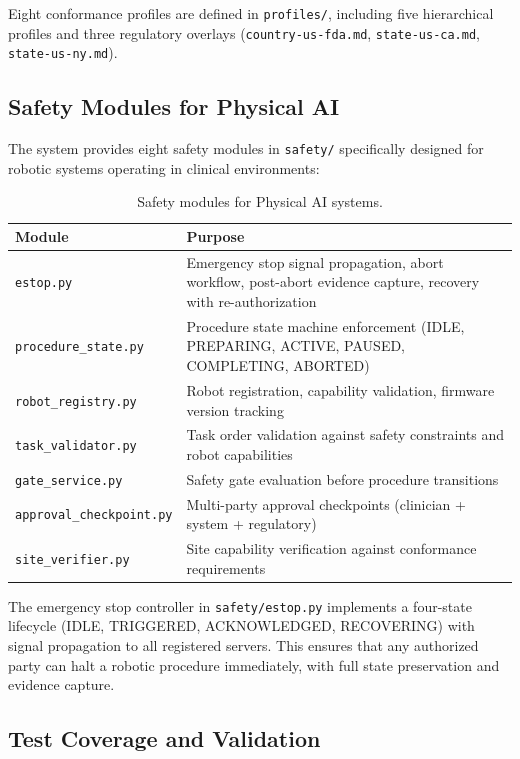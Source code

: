 
Eight conformance profiles are defined in \texttt{profiles/}, including five hierarchical profiles and three regulatory overlays (\texttt{country-us-fda.md}, \texttt{state-us-ca.md}, \texttt{state-us-ny.md}).

\subsection{Safety Modules for Physical AI}

The system provides eight safety modules in \texttt{safety/} specifically designed for robotic systems operating in clinical environments:

\begin{table}[H]
\centering
\caption{Safety modules for Physical AI systems.}
\label{tab:safety-modules}
\footnotesize
\begin{tabularx}{\textwidth}{@{}L{3.8cm}L{8.2cm}@{}}
\toprule
\textbf{Module} & \textbf{Purpose} \\
\midrule
\texttt{estop.py} & Emergency stop signal propagation, abort workflow, post-abort evidence capture, recovery with re-authorization \\
\texttt{procedure\_state.py} & Procedure state machine enforcement (IDLE, PREPARING, ACTIVE, PAUSED, COMPLETING, ABORTED) \\
\texttt{robot\_registry.py} & Robot registration, capability validation, firmware version tracking \\
\texttt{task\_validator.py} & Task order validation against safety constraints and robot capabilities \\
\texttt{gate\_service.py} & Safety gate evaluation before procedure transitions \\
\texttt{approval\_checkpoint.py} & Multi-party approval checkpoints (clinician + system + regulatory) \\
\texttt{site\_verifier.py} & Site capability verification against conformance requirements \\
\bottomrule
\end{tabularx}
\end{table}

The emergency stop controller in \texttt{safety/estop.py} implements a four-state lifecycle (IDLE, TRIGGERED, ACKNOWLEDGED, RECOVERING) with signal propagation to all registered servers. This ensures that any authorized party can halt a robotic procedure immediately, with full state preservation and evidence capture.

\subsection{Test Coverage and Validation}

